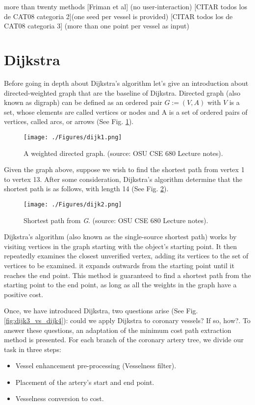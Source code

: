 more than twenty methods 
[Friman et al] (no user-interaction)
 [CITAR todos los de CAT08 categoria 2](one seed per vessel is provided)
[CITAR todos los de CAT08 categoria 3]  (more than one point per vessel as input)


\section{Dijkstra}\label{cent:dijk}

Before going in depth about Dijkstra's algorithm \citep{Dijkstra1959} let's give an introduction about
directed-weighted graph that are the baseline of Dijkstra.
Directed graph (also known as digraph) can be defined as an ordered pair $G:= (V,A)$ with $V$ is a set, whose elements are called vertices or nodes and A is a set of ordered pairs of vertices, called arcs, or arrows (See Fig. \ref{fig:dijk1}). 

\begin{figure}[ht]
	\centering
		\texttt{[image: ./Figures/dijk1.png]}
	\caption[Weighted Directed Graph]{A weighted directed graph.
	 (source: OSU CSE 680 Lecture notes).}
	\label{fig:dijk1}
\end{figure}

Given the graph above, suppose we wish to find the shortest path from vertex 1 to vertex 13. After some consideration, Dijkstra's algorithm determine that the shortest path is as follows, with length 14 (See Fig. \ref{fig:dijk2}). 
\begin{figure}[ht]
	\centering
		\texttt{[image: ./Figures/dijk2.png]}
	\caption[Shortest Path of a Directed Graph]{Shortest path from \textit{G}. (source: OSU CSE 680 Lecture notes).}
	\label{fig:dijk2}
\end{figure}

Dijkstra's algorithm (also known as the single-source shortest path) works by visiting vertices in the graph starting with the object’s starting point. It then repeatedly examines the closest unverified vertex, adding its vertices to the set of vertices to be examined. it expands outwards from the starting point until it reaches the end point. This method is guaranteed to find a shortest path from the starting point to the end point, as long as all the weights in the graph have a positive cost.

Once, we have introduced Dijkstra, two questions arise (See Fig. \ref{fig:dijk3_vs_dijk4}): could we apply Dijkstra to coronary vessels? If so, how?.
To answer these questions, an adaptation of the minimum cost path extraction method \citep{Metz2009} is presented.
For each branch of the coronary artery tree, we divide our task in three steps: 
\begin{itemize}
	\item Vessel enhancement pre-processing (Vesselness filter).
	\item Placement of the artery's start and end point.
	\item Vesselness conversion to cost.
\end{itemize}

